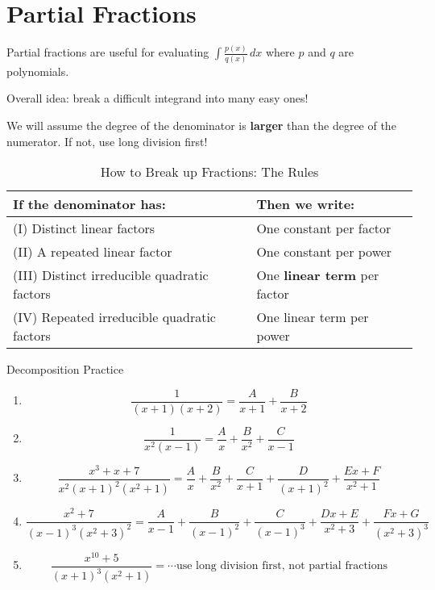 \section{Partial Fractions}
Partial fractions are useful for evaluating $ \int \frac{p(x)}{q(x)} \, d{x} $
where $ p $ and $ q $ are polynomials.

Overall idea: break a difficult integrand into many easy ones!
\begin{Remark}{}{}
    We will assume the degree of the denominator is \textbf{larger} than the
    degree of the numerator. If not, use long division first!
\end{Remark}

\begin{table}[!htbp]
    \caption{How to Break up Fractions: The Rules}
    \begin{tabularx}{\linewidth}{@{}YY@{}}
        \toprule
        If the denominator has:                      & Then we write:                      \\
        \midrule
        (I) Distinct linear factors                  & One constant per factor             \\
        (II) A repeated linear factor                & One constant per power              \\
        (III) Distinct irreducible quadratic factors & One \textbf{linear term} per factor \\
        (IV) Repeated irreducible quadratic factors  & One linear term per power
    \end{tabularx}
\end{table}

\begin{Example}{Decomposition Practice}{}
    \begin{enumerate}[label=(\roman*)]
        \item \[ \frac{1}{(x+1)(x+2)}=\frac{A}{x+1}+\frac{B}{x+2} \]
        \item \[ \frac{1}{x^2(x-1)}=\frac{A}{x} +\frac{B}{x^2}+\frac{C}{x-1} \]
        \item \[ \frac{x^3+x+7}{x^2(x+1)^2(x^2+1)}=\frac{A}{x} +\frac{B}{x^2}+\frac{C}{x+1}
                  +\frac{D}{(x+1)^2}+\frac{Ex+F}{x^2+1} \]
        \item \[ \frac{x^2+7}{(x-1)^3(x^2+3)^2}
                  =\frac{A}{x-1} +\frac{B}{(x-1)^2}+\frac{C}{(x-1)^3}+\frac{Dx+E}{x^2+3}
                  +\frac{Fx+G}{(x^2+3)^3} \]
        \item \[ \frac{x^{10}+5}{(x+1)^3(x^2+1)}=\cdots\text{use long division first, not partial
                      fractions} \]
    \end{enumerate}
\end{Example}

